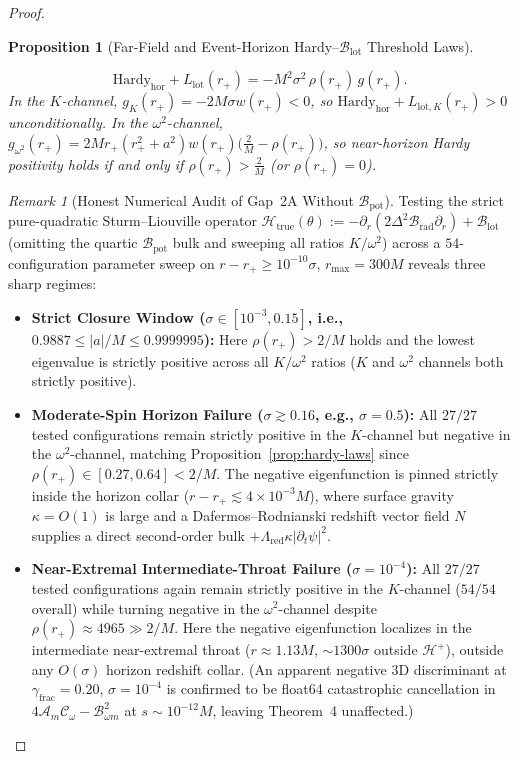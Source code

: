 \documentclass[11pt, a4paper]{article}
\newtheorem{proposition}{Proposition}
\theoremstyle{remark}
\newtheorem{remark}{Remark}
\begin{document}
\begin{proof}
\begin{proposition}[Far-Field and Event-Horizon Hardy--$\mathcal{B}_{\mathrm{lot}}$ Threshold Laws]
\begin{enumerate}
\begin{equation}
\mathrm{Hardy}_{\mathrm{hor}} + L_{\mathrm{lot}}(r_+) = -M^2\sigma^2\,\rho(r_+)\,g(r_+).
\end{equation}
In the $K$-channel, $g_K(r_+) = -2M\sigma w(r_+) < 0$, so $\mathrm{Hardy}_{\mathrm{hor}} + L_{\mathrm{lot},K}(r_+) > 0$ unconditionally. In the $\omega^2$-channel, $g_{\omega^2}(r_+) = 2Mr_+(r_+^2+a^2)w(r_+)\big(\frac{2}{M} - \rho(r_+)\big)$, so near-horizon Hardy positivity holds if and only if $\rho(r_+) > \frac{2}{M}$ (or $\rho(r_+) = 0$).
\end{enumerate}
\end{proposition}

\begin{remark}[Honest Numerical Audit of Gap~2A Without $\mathcal{B}_{\mathrm{pot}}$]
Testing the strict pure-quadratic Sturm--Liouville operator $\mathcal{H}_{\mathrm{true}}(\theta) := -\partial_r(2\Delta^2\mathcal{B}_{\mathrm{rad}}\partial_r) + \mathcal{B}_{\mathrm{lot}}$ (omitting the quartic $\mathcal{B}_{\mathrm{pot}}$ bulk and sweeping all ratios $K/\omega^2$) across a $54$-configuration parameter sweep on $r - r_+ \ge 10^{-10}\sigma$, $r_{\max} = 300M$ reveals three sharp regimes:
\begin{itemize}
\item \textbf{Strict Closure Window ($\sigma \in [10^{-3}, 0.15]$, i.e., $0.9887 \le |a|/M \le 0.9999995$):} Here $\rho(r_+) > 2/M$ holds and the lowest eigenvalue is strictly positive across all $K/\omega^2$ ratios ($K$ and $\omega^2$ channels both strictly positive).
\item \textbf{Moderate-Spin Horizon Failure ($\sigma \gtrsim 0.16$, e.g., $\sigma = 0.5$):} All $27/27$ tested configurations remain strictly positive in the $K$-channel but negative in the $\omega^2$-channel, matching Proposition~\ref{prop:hardy-laws} since $\rho(r_+) \in [0.27, 0.64] < 2/M$. The negative eigenfunction is pinned strictly inside the horizon collar ($r - r_+ \lesssim 4\times 10^{-3}M$), where surface gravity $\kappa = O(1)$ is large and a Dafermos--Rodnianski redshift vector field $N$ supplies a direct second-order bulk $+\Lambda_{\mathrm{red}}\kappa|\partial_t\psi|^2$.
\item \textbf{Near-Extremal Intermediate-Throat Failure ($\sigma = 10^{-4}$):} All $27/27$ tested configurations again remain strictly positive in the $K$-channel ($54/54$ overall) while turning negative in the $\omega^2$-channel despite $\rho(r_+) \approx 4965 \gg 2/M$. Here the negative eigenfunction localizes in the intermediate near-extremal throat ($r \approx 1.13M$, $\sim 1300\sigma$ outside $\mathcal{H}^+$), outside any $O(\sigma)$ horizon redshift collar. (An apparent negative $3$D discriminant at $\gamma_{\mathrm{frac}} = 0.20$, $\sigma = 10^{-4}$ is confirmed to be float64 catastrophic cancellation in $4\mathcal{A}_m\mathcal{C}_\omega - \mathcal{B}_{\omega m}^2$ at $s \sim 10^{-12}M$, leaving Theorem~4 unaffected.)

\end{itemize}
\end{remark}
\end{proof}
\end{document}
